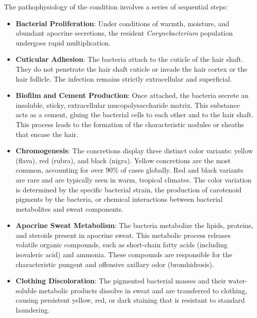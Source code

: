 The pathophysiology of the condition involves a series of sequential steps:
\begin{itemize}
    \item \textbf{Bacterial Proliferation}: Under conditions of warmth, moisture, and abundant apocrine secretions, the resident \textit{Corynebacterium} population undergoes rapid multiplication.
    \item \textbf{Cuticular Adhesion}: The bacteria attach to the cuticle of the hair shaft. They do not penetrate the hair shaft cuticle or invade the hair cortex or the hair follicle. The infection remains strictly extracellular and superficial.
    \item \textbf{Biofilm and Cement Production}: Once attached, the bacteria secrete an insoluble, sticky, extracellular mucopolysaccharide matrix. This substance acts as a cement, gluing the bacterial cells to each other and to the hair shaft. This process leads to the formation of the characteristic nodules or sheaths that encase the hair.
    \item \textbf{Chromogenesis}: The concretions display three distinct color variants: yellow (flava), red (rubra), and black (nigra). Yellow concretions are the most common, accounting for over 90\% of cases globally. Red and black variants are rare and are typically seen in warm, tropical climates. The color variation is determined by the specific bacterial strain, the production of carotenoid pigments by the bacteria, or chemical interactions between bacterial metabolites and sweat components.
    \item \textbf{Apocrine Sweat Metabolism}: The bacteria metabolize the lipids, proteins, and steroids present in apocrine sweat. This metabolic process releases volatile organic compounds, such as short-chain fatty acids (including isovaleric acid) and ammonia. These compounds are responsible for the characteristic pungent and offensive axillary odor (bromhidrosis).
    \item \textbf{Clothing Discoloration}: The pigmented bacterial masses and their water-soluble metabolic products dissolve in sweat and are transferred to clothing, causing persistent yellow, red, or dark staining that is resistant to standard laundering.
\end{itemize}


